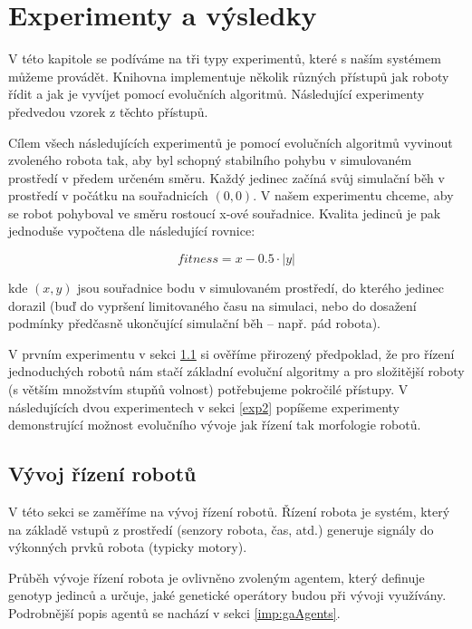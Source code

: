 \chapter{Experimenty a výsledky}

V této kapitole se podíváme na tři typy experimentů, které s naším systémem
můžeme provádět. Knihovna implementuje několik různých přístupů jak roboty
řídit a jak je vyvíjet pomocí evolučních algoritmů. Následující experimenty
předvedou vzorek z těchto přístupů. 

Cílem všech následujících experimentů je pomocí evolučních algoritmů vyvinout
zvoleného robota tak, aby byl schopný stabilního pohybu v simulovaném prostředí
v předem určeném směru. Každý jedinec začíná svůj simulační běh v prostředí v
počátku na souřadnicích $(0,0)$. V našem experimentu chceme, aby se robot
pohyboval ve směru rostoucí x-ové souřadnice. Kvalita jedinců je pak jednoduše
vypočtena dle následující rovnice:

\begin{equation} \label{fitness_calc}
    fitness = x - 0.5\cdot|y|
\end{equation}

kde $(x,y)$ jsou souřadnice bodu v simulovaném prostředí, do kterého jedinec
dorazil (buď do vypršení limitovaného času na simulaci, nebo do dosažení
podmínky předčasně ukončující simulační běh -- např. pád robota).

V prvním experimentu v sekci \ref{exp1} si ověříme přirozený předpoklad, že pro
řízení jednoduchých robotů nám stačí základní evoluční algoritmy a pro
složitější roboty (s větším množstvím stupňů volnost) potřebujeme pokročilé
přístupy. V následujících dvou experimentech v sekci \ref{exp2} popíšeme
experimenty demonstrující možnost evolučního vývoje jak řízení tak morfologie
robotů.

\section{Vývoj řízení robotů} \label{exp1}

V této sekci se zaměříme na vývoj řízení robotů. Řízení robota je systém,
který na základě vstupů z prostředí (senzory robota, čas, atd.) generuje
signály do výkonných prvků robota (typicky motory). 

Průběh vývoje řízení robota je ovlivněno zvoleným agentem, který definuje
genotyp jedinců a určuje, jaké genetické operátory budou při vývoji využívány.
Podrobnější popis agentů se nachází v sekci \ref{imp:gaAgents}.


